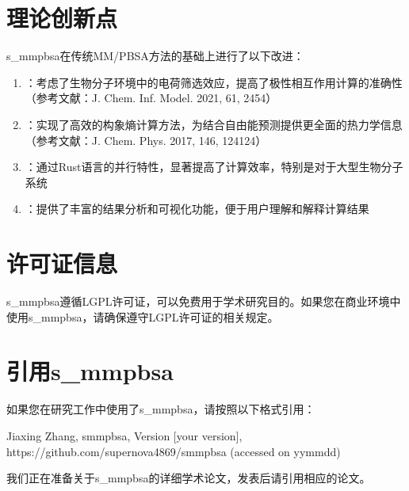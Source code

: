 \documentclass[letterpaper,10pt,english]{sphinxmanual}
\begin{document}
\section{理论创新点}
\label{\detokenize{introduction:id6}}
\sphinxAtStartPar
s\_mmpbsa在传统MM/PB\sphinxhyphen{}SA方法的基础上进行了以下改进：
\begin{enumerate}
%
\item {} 
\sphinxAtStartPar
{}：考虑了生物分子环境中的电荷筛选效应，提高了极性相互作用计算的准确性（参考文献：J. Chem. Inf. Model. 2021, 61, 2454）

\item {} 
\sphinxAtStartPar
{}：实现了高效的构象熵计算方法，为结合自由能预测提供更全面的热力学信息（参考文献：J. Chem. Phys. 2017, 146, 124124）

\item {} 
\sphinxAtStartPar
{}：通过Rust语言的并行特性，显著提高了计算效率，特别是对于大型生物分子系统

\item {} 
\sphinxAtStartPar
{}：提供了丰富的结果分析和可视化功能，便于用户理解和解释计算结果

\end{enumerate}


\section{许可证信息}
\label{\detokenize{introduction:id7}}
\sphinxAtStartPar
s\_mmpbsa遵循LGPL许可证，可以免费用于学术研究目的。如果您在商业环境中使用s\_mmpbsa，请确保遵守LGPL许可证的相关规定。


\section{引用s\_mmpbsa}
\label{\detokenize{introduction:id8}}
\sphinxAtStartPar
如果您在研究工作中使用了s\_mmpbsa，请按照以下格式引用：

\begin{sphinxVerbatim}[commandchars=\\\{\}]
Jiaxing Zhang, s\PYGZus{}mmpbsa, Version [your version], https://github.com/supernova4869/s\PYGZus{}mmpbsa (accessed on yy\PYGZhy{}mm\PYGZhy{}dd)
\end{sphinxVerbatim}

\sphinxAtStartPar
我们正在准备关于s\_mmpbsa的详细学术论文，发表后请引用相应的论文。
\end{document}
